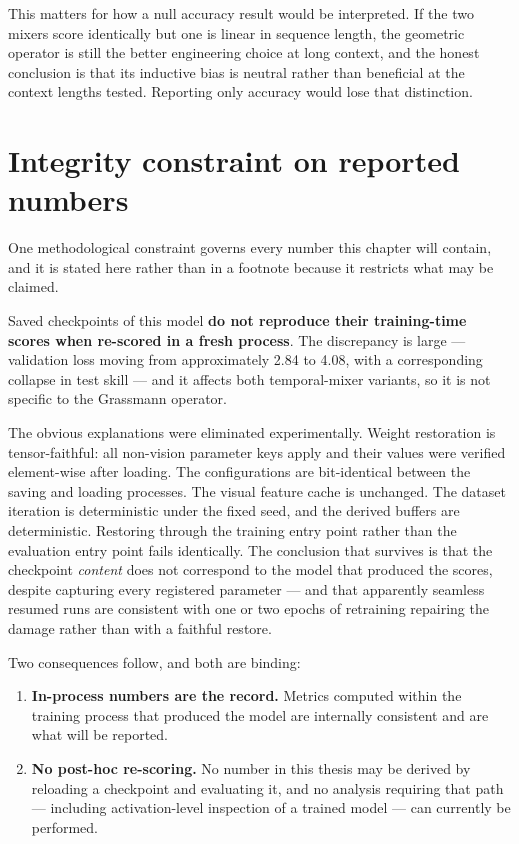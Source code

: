 This matters for how a null accuracy result would be interpreted. If the two mixers score
identically but one is linear in sequence length, the geometric operator is still the better
engineering choice at long context, and the honest conclusion is that its inductive bias is
neutral rather than beneficial at the context lengths tested. Reporting only accuracy would
lose that distinction.

\section{Integrity constraint on reported numbers}
\label{sec:integrity}

One methodological constraint governs every number this chapter will contain, and it is
stated here rather than in a footnote because it restricts what may be claimed.

Saved checkpoints of this model \textbf{do not reproduce their training-time scores when
re-scored in a fresh process}. The discrepancy is large --- validation loss moving from
approximately 2.84 to 4.08, with a corresponding collapse in test skill --- and it affects
both temporal-mixer variants, so it is not specific to the Grassmann operator.

The obvious explanations were eliminated experimentally. Weight restoration is
tensor-faithful: all non-vision parameter keys apply and their values were verified
element-wise after loading. The configurations are bit-identical between the saving and
loading processes. The visual feature cache is unchanged. The dataset iteration is
deterministic under the fixed seed, and the derived buffers are deterministic. Restoring
through the training entry point rather than the evaluation entry point fails identically.
The conclusion that survives is that the checkpoint \emph{content} does not correspond to the
model that produced the scores, despite capturing every registered parameter --- and that
apparently seamless resumed runs are consistent with one or two epochs of retraining
repairing the damage rather than with a faithful restore.

Two consequences follow, and both are binding:

\begin{enumerate}
  \item \textbf{In-process numbers are the record.} Metrics computed within the training
    process that produced the model are internally consistent and are what will be reported.
  \item \textbf{No post-hoc re-scoring.} No number in this thesis may be derived by reloading
    a checkpoint and evaluating it, and no analysis requiring that path --- including
    activation-level inspection of a trained model --- can currently be performed.
\end{enumerate}

